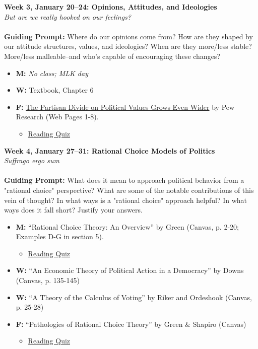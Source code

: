 \documentclass[11pt]{article}
\def\doubleq#1{``#1''}
\begin{document}
\textbf{Week 3, January 20--24: Opinions, Attitudes, and Ideologies}
\\
\textit{But are we really hooked on our feelings?}
\\\\
\textbf{Guiding Prompt:} Where do our opinions come from? How are they shaped by our attitude structures, values, and ideologies? When are they more/less stable? More/less malleable--and who’s capable of encouraging these changes? 
\begin{itemize}
\item \textbf{M:} \textit{No class; MLK day}
\item \textbf{W:} Textbook, Chapter 6
\item \textbf{F:} \href{https://www.people-press.org/2017/10/05/8-partisan-animosity-personal-politics-views-of-trump/}{The Partisan Divide on Political Values Grows Even Wider} by Pew Research (Web Pages 1-8). 
\begin{itemize}
\item\underline{Reading Quiz}
\end{itemize}
\end{itemize}


\textbf{Week 4, January 27--31: Rational Choice Models of Politics}
\\
\textit{Suffrago ergo sum}
\\\\
\textbf{Guiding Prompt:} What does it mean to approach political behavior from a "rational choice" perspective? What are some of the notable contributions of this vein of thought? In what ways is a "rational choice" approach helpful? In what ways does it fall short? Justify your answers.
\begin{itemize}
\item \textbf{M:} \doubleq{Rational Choice Theory: An Overview} by Green (Canvas, p. 2-20; Examples D-G in section 5).  
\begin{itemize}
\item\underline{Reading Quiz}
\end{itemize}
\item \textbf{W:} \doubleq{An Economic Theory of Political Action in a Democracy} by Downs (Canvas, p. 135-145)  
\item \textbf{W:} \doubleq{A Theory of the Calculus of Voting} by Riker and Ordeshook (Canvas, p. 25-28) 
\item \textbf{F:} \doubleq{Pathologies of Rational Choice Theory} by Green \& Shapiro (Canvas)
\begin{itemize}
\item\underline{Reading Quiz}
\end{itemize}
\end{itemize}
\end{document}

